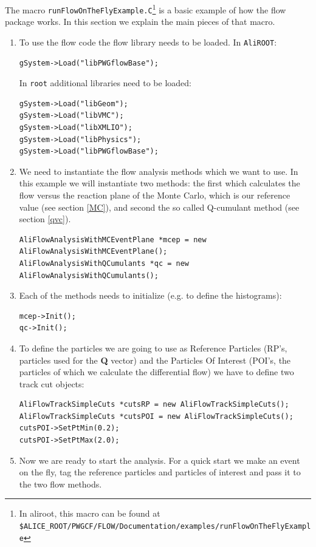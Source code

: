 \documentclass[a5paper]{book}
\numberwithin{equation}{subsection}
\begin{document}
The macro \texttt{runFlowOnTheFlyExample.C}\footnote{In aliroot, this macro can be found at \\ \texttt{\$ALICE\_ROOT/PWGCF/FLOW/Documentation/examples/runFlowOnTheFlyExample}} is a basic example of how the flow package works. 
In this section we explain the main pieces of that macro.
\begin{enumerate}
	\item To use the flow code the flow library needs to be loaded. In \texttt{AliROOT}:
	\begin{lstlisting}
gSystem->Load("libPWGflowBase");\end{lstlisting}
	In \texttt{root} additional libraries need to be loaded: 
	\begin{lstlisting}
gSystem->Load("libGeom");
gSystem->Load("libVMC");
gSystem->Load("libXMLIO");
gSystem->Load("libPhysics");
gSystem->Load("libPWGflowBase");\end{lstlisting}
	\item We need to instantiate the flow analysis methods which we want to use. In this example we will
	instantiate two methods: the first which calculates the flow versus the reaction plane of the Monte Carlo, which is our reference value (see section \ref{MC}), and second the so called Q-cumulant method (see section \ref{qvc}).
	\begin{lstlisting}
AliFlowAnalysisWithMCEventPlane *mcep = new AliFlowAnalysisWithMCEventPlane();
AliFlowAnalysisWithQCumulants *qc = new AliFlowAnalysisWithQCumulants();\end{lstlisting}
	\item Each of the methods needs to initialize (e.g. to define the histograms): 
	\begin{lstlisting}
mcep->Init(); 
qc->Init();\end{lstlisting}
	\item To define the particles we are going to use as Reference Particles  (RP's, particles 
	used for the {\bf Q} vector) and the Particles Of Interest  (POI's, the particles of which 
	we calculate the differential flow) we have to define two track cut objects:
	\begin{lstlisting}
AliFlowTrackSimpleCuts *cutsRP = new AliFlowTrackSimpleCuts();
AliFlowTrackSimpleCuts *cutsPOI = new AliFlowTrackSimpleCuts();
cutsPOI->SetPtMin(0.2);
cutsPOI->SetPtMax(2.0);	\end{lstlisting}
	\item Now we are ready to start the analysis. For a quick start we make an event on the fly, tag the reference particles and particles of interest  and pass it to the two flow methods. 
	

\end{enumerate}
\end{document}
